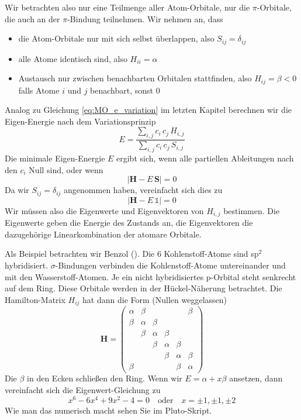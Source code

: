 Wir betrachten also nur eine Teilmenge aller Atom-Orbitale, nur die $\pi$-Orbitale, die auch an der $\pi$-Bindung teilnehmen. Wir nehmen an, dass
\begin{itemize} \setlength{\itemsep}{0pt}
\item die Atom-Orbitale nur mit sich selbst überlappen, also $S_{ij} = \delta_{ij}$
\item alle Atome identisch sind, also $H_{ii} = \alpha$
\item Austausch nur zwischen benachbarten Orbitalen stattfinden, also  $H_{ij} = \beta < 0 $ falls Atome $i$ und $j$ benachbart, sonst $0$ 
\end{itemize}

Analog zu Gleichung \ref{eq:MO_e_variation} im letzten Kapitel berechnen wir die Eigen-Energie nach dem Variationsprinzip
\begin{equation}
 E = \frac{  \sum_{i,j} c_i \, c_j \, H_{i,j} }{ \sum_{i,j} c_i \, c_j \, S_{i,j} }
\end{equation}
Die minimale Eigen-Energie $E$ ergibt sich, wenn alle partiellen Ableitungen nach den $c_i$ Null sind, oder wenn
\begin{equation}
 \left| \mathbf{H} - E \, \mathbf{S}\right| = 0
\end{equation}
Da wir $S_{ij} = \delta_{ij}$ angenommen haben, vereinfacht sich dies zu 
\begin{equation}
 \left| \mathbf{H} - E \, \mathds{1} \right| = 0
\end{equation}
Wir müssen also die Eigenwerte und Eigenvektoren von $H_{i,j}$ bestimmen. Die Eigenwerte geben die Energie des Zustands an, die Eigenvektoren die dazugehörige  Linearkombination der atomare Orbitale.


Als Beispiel betrachten wir Benzol (). Die 6 Kohlenstoff-Atome sind sp$^2$ hybridisiert. $\sigma$-Bindungen verbinden die Kohlenstoff-Atome untereinander und mit den Wasserstoff-Atomen. Je ein nicht hybridisiertes p-Orbital steht senkrecht auf dem Ring. Diese Orbitale werden in der Hückel-Näherung betrachtet. Die Hamilton-Matrix $H_{ij}$ hat dann die Form (Nullen weggelassen)
\begin{equation}
\mathbf{H} = 
 \begin{pmatrix}
  \alpha  & \beta &  &  &  & \beta \\
  \beta & \alpha  & \beta & & & \\
  & \beta & \alpha  & \beta & & \\
 &  & \beta & \alpha & \beta & \\
&  &  & \beta & \alpha & \beta \\
\beta & &  &  & \beta & \alpha 
 \end{pmatrix} 
\end{equation}
Die $\beta$ in den Ecken schließen den Ring.
Wenn wir $E = \alpha + x \beta$ ansetzen, dann vereinfacht sich die Eigenwert-Gleichung zu 
\begin{equation}
x^6 - 6 x^4 + 9x^2 - 4 = 0 \quad \text{oder} \quad x = \pm 1, \pm 1, \pm 2
\end{equation}
Wie man das numerisch macht sehen Sie im  
Pluto-Skript.





